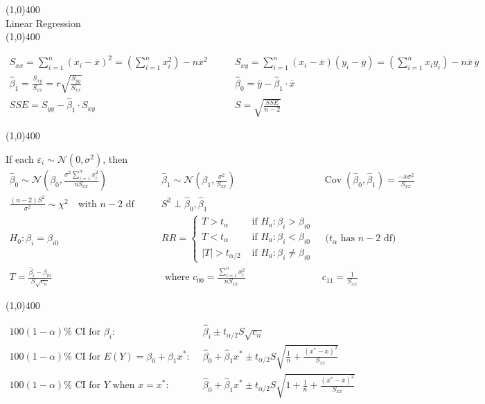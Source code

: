 \documentclass[11pt]{article}
\newcommand{\e}{\varepsilon}                        %
\newcommand{\Cov}{\operatorname{Cov}}               %
\newcommand{\ol}{\overline}
\newcommand{\bz}{\hat \beta_0}
\newcommand{\bo}{\hat \beta_1}
\newcommand{\No}{\mathcal{N}}                       %
\begin{document}
\newpage
\begin{center}
\line(1,0){400}\\
{\large Linear Regression}\\
\vspace{-0.1in}
\line(1,0){400}
\end{center}
\begin{align*}
S_{xx}
    = \sum_{i = 1}^n (x_i - \ol x)^2
    = \left( \sum_{i = 1}^n x_i^2 \right) - n \ol x^2
\quad \quad &
S_{xy}
    = \sum_{i = 1}^n (x_i - \ol x)(y_i - \ol y)
    = \left( \sum_{i = 1}^n x_iy_i \right) - n \ol x \, \ol y   \\
\bo = \frac{S_{xy}}{S_{xx}} = r\sqrt{\frac{S_{yy}}{S_{xx}}}
\quad \quad &
\bz = \ol y - \bo \cdot \ol x   \\
SSE = S_{yy} - \bo \cdot S_{xy}
\quad \quad &
S = \sqrt{\frac{SSE}{n - 2}}
\end{align*}
\begin{center}
\line(1,0){400}
\end{center}
If each $\e_i \sim \No(0,\sigma^2)$, then
\begin{align*}
\bz \sim \No\left(\beta_0, \frac{\sigma^2\sum_{i = 1}^n x_i^2}{nS_{xx}}\right)
\quad \quad &
\bo \sim \No\left(\beta_1, \frac{\sigma^2}{S_{xx}}\right)
\quad \quad &
\Cov(\bz,\bo) = \frac{-\ol x \sigma^2}{S_{xx}}  \\
\frac{(n - 2)S^2}{\sigma^2} \sim \chi^2 \quad \mbox{with $n - 2$ df}
\quad \quad &
S^2 \perp \bz, \bo  \\
H_0 : \beta_i = \beta_{i0}
\quad \quad &
RR = \left\{
\begin{array}{cl}
T > t_\alpha            & \mbox{ if } H_a : \beta_i > \beta_{i0}    \\
T < t_\alpha            & \mbox{ if } H_a : \beta_i < \beta_{i0}    \\
|T| > t_{\alpha/2}   & \mbox{ if } H_a : \beta_i \neq \beta_{i0}
\end{array}
    \right.
&
\mbox{ ($t_{\alpha}$ has $n - 2$ df)}    \\
T = \frac{\hat \beta_i - \beta_{i0}}{S\sqrt{c_{ii}}}
\quad \quad &
\mbox{ where } c_{00} = \frac{\sum_{i = 1}^n x_i^2}{nS_{xx}}
\quad \quad &
c_{11} = \frac{1}{S_{xx}}
\end{align*}
\begin{center}
\line(1,0){400}
\end{center}
\begin{align*}
\mbox{$100(1 - \alpha)\%$ CI for $\beta_i$:}
\quad \quad &
\hat\beta_i \pm t_{\alpha/2}S\sqrt{c_{ii}}  \\
\mbox{$100(1 - \alpha)\%$ CI for $E(Y) = \beta_0 + \beta_1x^*$:}
\quad \quad &
\bz + \bo x^* \pm t_{\alpha/2}S\sqrt{\frac{1}{n}
                                    + \frac{(x^* - \ol x)^2}{S_{xx}}}   \\
\mbox{$100(1 - \alpha)\%$ CI for $Y$ when $x = x^*$:}
\quad \quad &
\bz + \bo x^* \pm t_{\alpha/2}S\sqrt{1 + \frac{1}{n}
                                    + \frac{(x^* - \ol x)^2}{S_{xx}}}
\end{align*}
\end{document}
